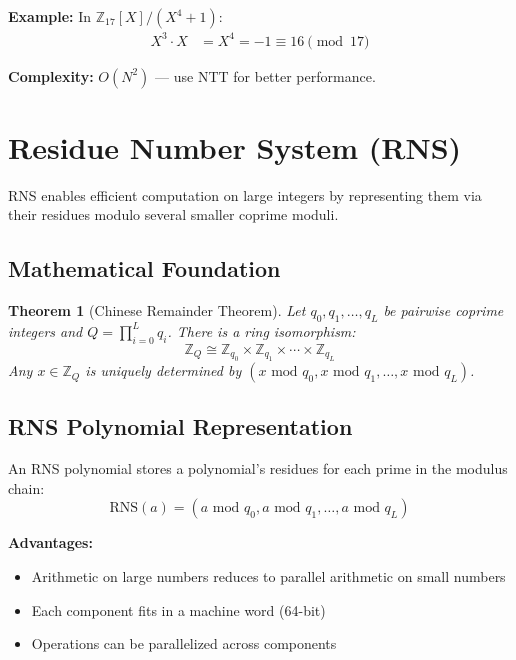 \documentclass[11pt,a4paper]{article}
\newtheorem{theorem}{Theorem}
\newcommand{\Z}{\mathbb{Z}}
\newcommand{\bmod}{\text{ mod }}
\begin{document}
\textbf{Example:} In $\Z_{17}[X]/(X^4 + 1)$:
\begin{align*}
X^3 \cdot X &= X^4 = -1 \equiv 16 \pmod{17}
\end{align*}

\textbf{Complexity:} $O(N^2)$ — use NTT for better performance.

\section{Residue Number System (RNS)}

RNS enables efficient computation on large integers by representing them via their residues modulo several smaller coprime moduli.

\subsection{Mathematical Foundation}

\begin{theorem}[Chinese Remainder Theorem]
Let $q_0, q_1, \ldots, q_L$ be pairwise coprime integers and $Q = \prod_{i=0}^{L} q_i$. There is a ring isomorphism:
\[
\Z_Q \cong \Z_{q_0} \times \Z_{q_1} \times \cdots \times \Z_{q_L}
\]
Any $x \in \Z_Q$ is uniquely determined by $(x \bmod q_0, x \bmod q_1, \ldots, x \bmod q_L)$.
\end{theorem}

\subsection{RNS Polynomial Representation}

An RNS polynomial stores a polynomial's residues for each prime in the modulus chain:
\[
\text{RNS}(a) = (a \bmod q_0, a \bmod q_1, \ldots, a \bmod q_L)
\]

\textbf{Advantages:}
\begin{itemize}
    \item Arithmetic on large numbers reduces to parallel arithmetic on small numbers
    \item Each component fits in a machine word (64-bit)
    \item Operations can be parallelized across components
\end{itemize}
\end{document}
